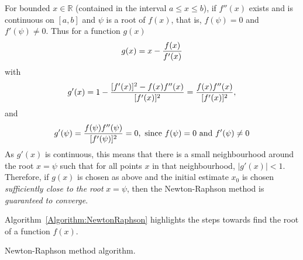 For bounded $x\in\mathbb{R}$ (\ie contained in the interval $a\leq x \leq b$), if $f''(x)$ exists and is continuous on $[a,b]$ and $\psi$ is a root of $f(x)$, that is, $f(\psi)=0$ and $f'(\psi)\neq0$. Thus for a function $g(x)$
    \begin{displaymath}
        g(x) = x - \displaystyle\frac{f(x)}{f'(x)}
    \end{displaymath}
with
    \begin{displaymath}
        g'(x) = 1 - \displaystyle\frac{[f'(x)]^{2} - f(x)f''(x)}{[f'(x)]^{2}} = \displaystyle\frac{f(x)f''(x)}{[f'(x)]^{2}},
    \end{displaymath}
and
    \begin{displaymath}
        g'(\psi) = \displaystyle\frac{f(\psi)f''(\psi)}{[f'(\psi)]^{2}}=0, \text{ since } f(\psi) = 0 \text{ and } f'(\psi) \neq 0
    \end{displaymath}
As $g'(x)$ is continuous, this means that there is a small neighbourhood around the root $x=\psi$ such that for all points $x$ in that neighbourhood, $\left|g'(x)\right|<1$.  Therefore, if $g(x)$ is chosen as above and the initial estimate $x_{0}$ is chosen {\it sufficiently close to the root} $x=\psi$, then the Newton-Raphson method is {\it guaranteed to converge}. 

Algorithm~\ref{Algorithm:NewtonRaphson} highlights the steps towards find the root of a function $f(x)$.

\begin{algorithm}[h]%



 \caption{Newton-Raphson method algorithm.}\label{Algorithm:NewtonRaphson}
\end{algorithm}

